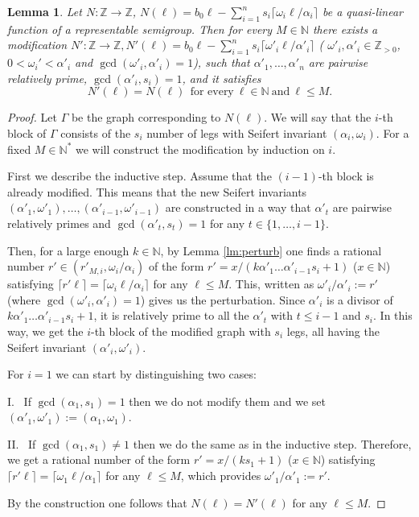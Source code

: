 \documentclass[oneside]{amsart}
\numberwithin{equation}{section}
\numberwithin{equation}{subsection}
\theoremstyle{plain}
\newtheorem{lemma}[equation]{Lemma}
\theoremstyle{definition}
\def\Z{\mathbb Z}
\newcommand{\w}{\omega}
\newcommand{\al}{\alpha}
\renewcommand{\Z}{\mathbb{Z}}
\newcommand{\Na}{\mathbb{N}}
\begin{document}
    \begin{lemma}\label{lem:pertN}
        Let $N\colon\Z\to\Z$, $N(\ell)=b_0\ell-\sum_{i=1}^n s_i\lceil \w_i\ell/\al_i\rceil$
        be a quasi-linear function of a representable semigroup. 
        Then for every $M\in \Na$ there exists a modification   
        $N'\colon\Z\to\Z, N'(\ell)=b_0\ell-\sum_{i=1}^{n} s_i\lceil \w'_i\ell/\al'_i\rceil$ (
        $\w'_i,\al'_i\in\Z_{>0}$, $0<\w_i'<\al'_i$ and $\gcd(\w'_i,\al'_i)=1$), such that 
        $\al'_1,\dots,\al'_n$ are pairwise relatively prime, $\gcd(\al'_i,s_i)=1$, and it satisfies  
        \[
        N'(\ell )=N(\ell) \ \ \mbox{for every} \ \ell\in \mathbb{N} \ \mbox{and} \ \ell\leq M .
        \] 
    \end{lemma}
    \begin{proof}
    
        Let $\Gamma$ be the graph corresponding to $N(\ell)$. We will say that the $i$-th block of $\Gamma$ consists of the $s_i$ number of legs with Seifert invariant $(\al_i,\w_i)$. For a fixed $M\in\Na^*$ we will construct the modification by induction on $i$. 
        
        First we describe the inductive step. Assume that the $(i-1)$-th block is already modified. This means that the new Seifert invariants $(\al'_1,\w'_1),\dots,(\al'_{i-1},\w'_{i-1})$ are constructed in a way that $\al'_t$ are pairwise relatively primes and $\gcd(\al'_t,s_t)=1$ for any $t\in\{1,\dots,i-1\}$.  
        
        Then, for a large enough $k\in\Na$, by Lemma \ref{lm:perturb} one finds a rational number $r'\in(r'_{M,i},\w_i/\al_i)$ of the form $r'=x/(k\al'_1\dots\al'_{i-1}s_i+1)$ ($x\in\Na$) satisfying $\lceil r'\ell\rceil=\lceil\w_i\ell/\al_i\rceil$ for any $\ell\leq M$. This, written as  $\w'_i/\al'_i:=r'$ (where $\gcd(\w'_i,\al'_i)=1$) gives us the perturbation. Since  $\al'_i$ is a divisor of 
        $k\al'_1\dots\al'_{i-1}s_i+1$, it is relatively prime to all the $\al'_t$ with $t\leq i-1$ and $s_i$. In this way, we get the $i$-th block of the modified graph with $s_i$ legs, all having the Seifert invariant $(\al'_i,\w'_i)$.
        
        For $i=1$ we can start by distinguishing two cases:
        
        I. \ If $\gcd(\al_1,s_1)=1$ then we do not modify them and we set $(\al'_1,\w'_1):=(\al_1,\w_1)$. 
        
        II. \ If $\gcd(\al_1,s_1)\neq 1$ then we do the same as in the inductive step. Therefore,  we get a rational number of the form $r'=x/(ks_1+1)$ ($x\in\Na$) satisfying $\lceil r'\ell\rceil=\lceil\w_1\ell/\al_1\rceil$ for any $\ell\leq M$, which provides $\w'_1/\al'_1:=r'$.
        
        By the construction one follows that $N(\ell)=N'(\ell)$ for any $\ell\leq M$.
    \end{proof}
    
\end{document}
